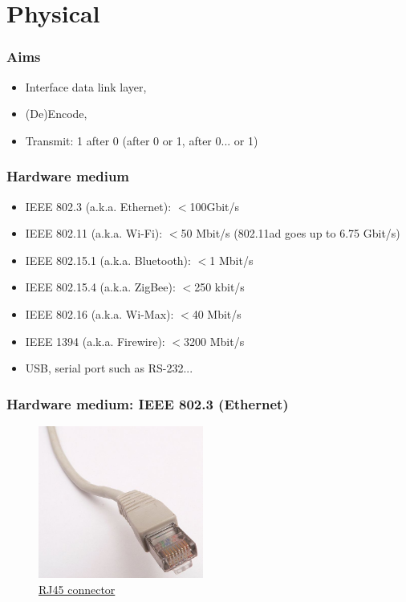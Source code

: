 \section{Physical}
  \begin{frame}
    \frametitle{Aims}
      \begin{itemize}
        \item Interface data link layer,
        \item (De)Encode,
        \item Transmit: 1 after 0 (after 0 or 1, after 0... or 1)
      \end{itemize}
  \end{frame}
  \begin{frame}
    \frametitle{Hardware medium}
      \begin{itemize}
        \item IEEE 802.3 (a.k.a. Ethernet): $<$100Gbit/s
        \item IEEE 802.11 (a.k.a. Wi-Fi): $<$50 Mbit/s (802.11ad goes up to 6.75 Gbit/s)
        \item IEEE 802.15.1 (a.k.a. Bluetooth): $<$1 Mbit/s
        \item IEEE 802.15.4 (a.k.a. ZigBee): $<$250 kbit/s
        \item IEEE 802.16 (a.k.a. Wi-Max): $<$40 Mbit/s
        \item IEEE 1394 (a.k.a. Firewire): $<$3200 Mbit/s
        \item USB, serial port such as RS-232...
      \end{itemize}
  \end{frame}
  \begin{frame}
    \frametitle{Hardware medium: IEEE 802.3 (Ethernet)}
    \begin{figure}[t]
      \centering
      \includegraphics[height=5cm]{./imgs/rj45.jpg}
      \caption{\color{blue}\href{https://en.wikipedia.org/wiki/File:Ethernet_RJ45_connector_p1160054.jpg}{RJ45 connector}}
      \label{fig:rj45}
    \end{figure}
  \end{frame}
